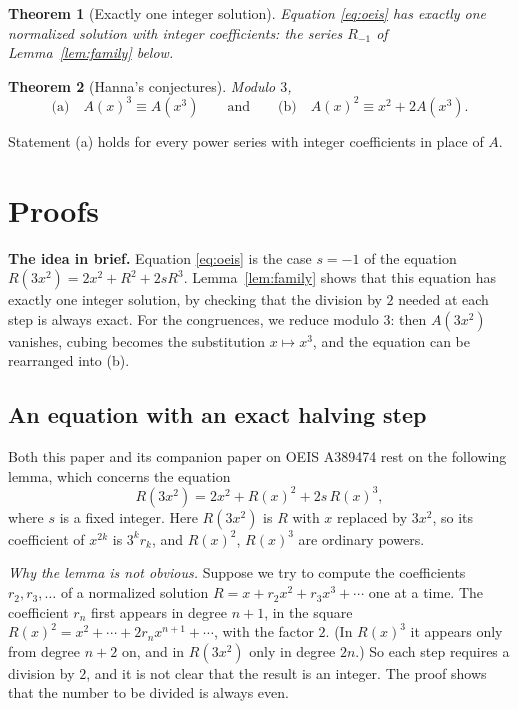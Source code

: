 \documentclass[11pt,a4paper]{article}
\newtheorem{theorem}{Theorem}[section]
\theoremstyle{definition}
\theoremstyle{remark}
\newcommand{\para}[1]{\par\medskip\noindent\textbf{#1}\enspace}
\begin{document}
\begin{theorem}[Exactly one integer solution]\label{thm:exist}
Equation \eqref{eq:oeis} has exactly one normalized solution with integer coefficients: the series $R_{-1}$ of
Lemma~\ref{lem:family} below.
\end{theorem}

\begin{theorem}[Hanna's conjectures]\label{thm:three}
Modulo $3$,
\[
\text{(a)}\quad A(x)^3\equiv A(x^3)\qquad\text{and}\qquad\text{(b)}\quad A(x)^2\equiv x^2+2A(x^3).
\]
\end{theorem}
Statement (a) holds for every power series with integer coefficients in place of $A$.

\section{Proofs}\label{sec:proofs}

\para{The idea in brief.} Equation \eqref{eq:oeis} is the case $s=-1$ of the equation $R(3x^2)=2x^2+R^2+2sR^3$. Lemma~\ref{lem:family}
shows that this equation has exactly one integer solution, by checking that the division by $2$ needed at each step is
always exact. For the congruences, we reduce modulo $3$: then $A(3x^2)$ vanishes, cubing becomes the substitution
$x\mapsto x^3$, and the equation can be rearranged into (b).

\subsection{An equation with an exact halving step}
Both this paper and its companion paper on OEIS A389474 rest on the following lemma, which concerns the
equation
\begin{equation}\label{eq:family}
R(3x^2)=2x^2+R(x)^2+2s\,R(x)^3 ,
\end{equation}
where $s$ is a fixed integer. Here $R(3x^2)$ is $R$ with $x$ replaced by $3x^2$, so its coefficient of $x^{2k}$ is
$3^kr_k$, and $R(x)^2$, $R(x)^3$ are ordinary powers.

\emph{Why the lemma is not obvious.} Suppose we try to compute the coefficients $r_2,r_3,\dots$ of a normalized
solution $R=x+r_2x^2+r_3x^3+\cdots$ one at a time. The coefficient $r_n$ first appears in degree $n+1$, in the square
$R(x)^2=x^2+\cdots+2r_nx^{n+1}+\cdots$, with the factor $2$. (In $R(x)^3$ it appears only from degree $n+2$ on, and in
$R(3x^2)$ only in degree $2n$.) So each step requires a division by $2$, and it is not clear that the result is an
integer. The proof shows that the number to be divided is always even.
\end{document}

